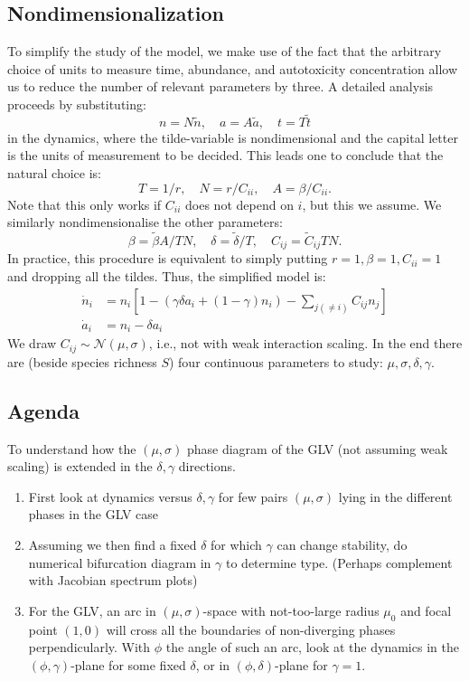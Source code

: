 \documentclass{article}
\begin{document}
\subsection{Nondimensionalization}
To simplify the study of the model, we make use of the fact that the arbitrary choice of units to measure time, abundance, and autotoxicity concentration allow us to reduce the number of relevant parameters by three. A detailed analysis proceeds by substituting:
\begin{equation}
n = N\tilde{n}, \quad a = A\tilde{a}, \quad t= T\tilde{t}
\end{equation}
in the dynamics, where the tilde-variable is nondimensional and the capital letter is the units of measurement to be decided. This leads one to conclude that the natural choice is:
\begin{equation}
T = 1/r, \quad N= r/C_{ii}, \quad A=\beta/C_{ii}.
\end{equation}
Note that this only works if $C_{ii}$ does not depend on $i$, but this we assume. We similarly nondimensionalise the other parameters:
\begin{equation}
\beta = \tilde{\beta}A/TN, \quad \delta = \tilde{\delta}/T, \quad C_{ij} = \tilde{C}_{ij}TN.
\end{equation}
In practice, this procedure is equivalent to simply putting $r=1,\beta=1,C_{ii}=1$ and dropping all the tildes. Thus, the simplified model is:
\begin{align}
\dot{n}_i &= n_i\left[ 1 - \left(\gamma \delta a_i + (1-\gamma)n_i\right) - \sum_{j(\neq i)} C_{ij} n_j \right] \\
\dot{a}_i &= n_i - \delta a_i
\end{align}
We draw $C_{ij}\sim \mathcal{N}(\mu,\sigma)$, i.e., not with weak interaction scaling. In the end there are (beside species richness $S$) four continuous parameters to study: $\mu,\sigma,\delta,\gamma$.

\subsection{Agenda}
To understand how the $(\mu,\sigma)$ phase diagram of the GLV (not assuming weak scaling) is extended in the $\delta,\gamma$ directions.
\begin{enumerate}
    \item First look at dynamics versus $\delta,\gamma$ for few pairs $(\mu,\sigma)$ lying in the different phases in the GLV case
    \item Assuming we then find a fixed $\delta$ for which $\gamma$ can change stability, do numerical bifurcation diagram in $\gamma$ to determine type. (Perhaps complement with Jacobian spectrum plots)
    \item For the GLV, an arc in $(\mu,\sigma)$-space with not-too-large radius $\mu_0$ and focal point $(1,0)$ will cross all the boundaries of non-diverging phases perpendicularly. With $\phi$ the angle of such an arc, look at the dynamics in the $(\phi,\gamma)$-plane for some fixed $\delta$, or in $(\phi,\delta)$-plane for $\gamma=1$.
\end{enumerate}
\end{document}
